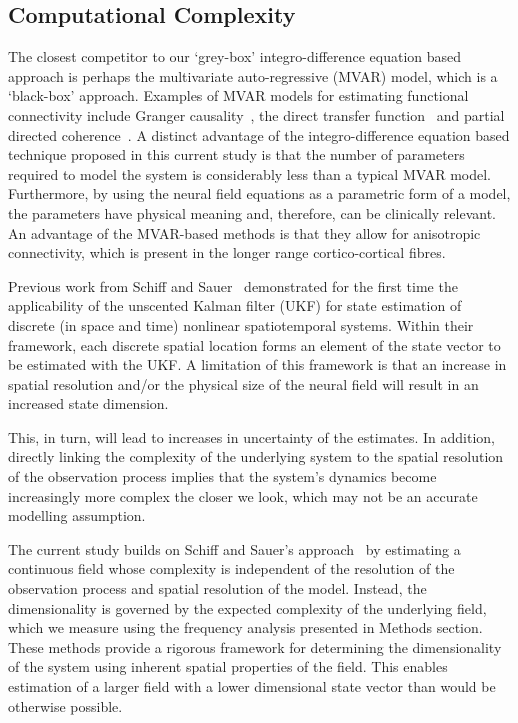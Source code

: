 \documentclass[12pt]{iopart}
\begin{document}
\subsection{Computational Complexity}
The closest competitor to our `grey-box' integro-difference equation based approach is perhaps the multivariate auto-regressive (MVAR) model, which is a `black-box' approach. Examples of MVAR models for estimating functional connectivity include Granger causality~\cite{Hesse2003}, the direct transfer function~\cite{Kaminski1991} and partial directed coherence~\cite{Sameshima1999}. A distinct advantage of the integro-difference equation based technique proposed in this current study is that the number of parameters required to model the system is considerably less than a typical MVAR model. Furthermore, by using the neural field equations as a parametric form of a model, the parameters have physical meaning and, therefore, can be clinically relevant. An advantage of the MVAR-based methods is that they allow for anisotropic connectivity, which is present in the longer range cortico-cortical fibres. 

Previous work from Schiff and Sauer~\cite{schiff2008kalman} demonstrated for the first time the applicability of the unscented Kalman filter (UKF) for state estimation of discrete (in space and time) nonlinear spatiotemporal systems. Within their framework, each discrete spatial location forms an element of the state vector to be estimated with the UKF. A limitation of this framework is that an increase in spatial resolution and/or the physical size of the neural field will result in an increased state dimension. 

This, in turn, will lead to increases in uncertainty of the estimates. In addition, directly linking the complexity of the underlying system to the spatial resolution of the observation process implies that the system's dynamics become increasingly more complex the closer we look, which may not be an accurate modelling assumption.

The current study builds on Schiff and Sauer's approach~\cite{schiff2008kalman} by estimating a continuous field whose complexity is independent of the resolution of the observation process and spatial resolution of the model. Instead, the dimensionality is governed by the expected complexity of the underlying field, which we measure using the frequency analysis presented in Methods section. These methods provide a rigorous framework for determining the dimensionality of the system using inherent spatial properties of the field. This enables estimation of a larger field with a lower dimensional state vector than would be otherwise possible. 
\end{document}
